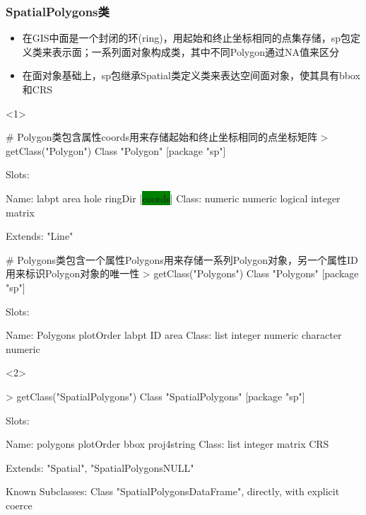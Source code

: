 \subsubsection{SpatialPolygons类}
\begin{frame}[t,fragile]{\subsecname}{\subsubsecname}
\begin{itemize}
\item<1-> 在GIS中面是一个封闭的环(ring)，用起始和终止坐标相同的点集存储，sp包定义类来表示面；一系列面对象构成类，其中不同Polygon通过NA值来区分
\item<2-> 在面对象基础上，sp包继承Spatial类定义类来表达空间面对象，使其具有bbox和CRS
\end{itemize}

\begin{overlayarea}{\textwidth}{\textheight}
\begin{onlyenv}<1>
\begin{rcode}
# Polygon类包含属性coords用来存储起始和终止坐标相同的点坐标矩阵
> getClass("Polygon")
Class "Polygon" [package "sp"]

Slots:
                                              
Name:    labpt    area    hole ringDir  |\colorbox{green}{coords}|
Class: numeric numeric logical integer  matrix

Extends: "Line"

# Polygons类包含一个属性Polygons用来存储一系列Polygon对象，另一个属性ID用来标识Polygon对象的唯一性
> getClass("Polygons")
Class "Polygons" [package "sp"]

Slots:
                                                        
Name:   Polygons plotOrder     labpt        ID      area
Class:      list   integer   numeric character   numeric
\end{rcode}
\end{onlyenv}

\begin{onlyenv}<2>
\begin{rcode}
> getClass("SpatialPolygons")
Class "SpatialPolygons" [package "sp"]

Slots:
                                                      
Name:     polygons   plotOrder        bbox proj4string
Class:        list     integer      matrix         CRS

Extends: "Spatial", "SpatialPolygonsNULL"

Known Subclasses: 
Class "SpatialPolygonsDataFrame", directly, with explicit coerce
\end{rcode}
\end{onlyenv}
\end{overlayarea}
\end{frame}

